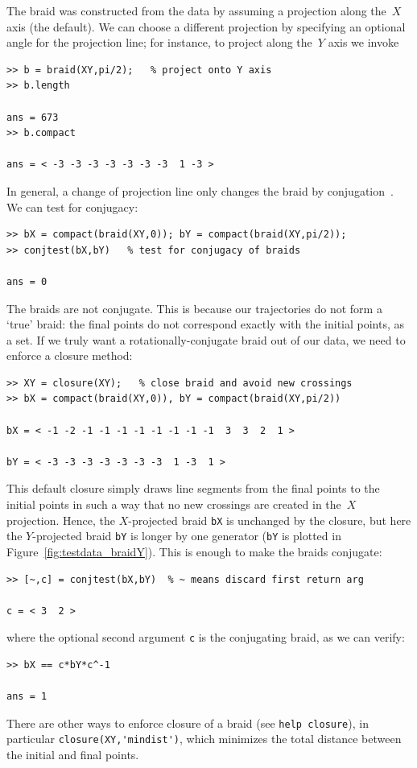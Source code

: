\documentclass[12pt]{article}
\begin{document}
The braid was constructed from the data by assuming a projection along
the~$X$ axis (the default).  We can choose a different projection by
specifying an optional angle for the projection line; for instance, to
project along the~$Y$ axis we invoke
\begin{lstlisting}[frame=single,framerule=0pt]
>> b = braid(XY,pi/2);   % project onto Y axis
>> b.length

ans = 673
>> b.compact

ans = < -3 -3 -3 -3 -3 -3 -3  1 -3 >
\end{lstlisting}
In general, a change of projection line only changes the braid by
conjugation~\citep{Boyland1994,Thiffeault2010}.  We can test for
conjugacy:
\begin{lstlisting}[frame=single,framerule=0pt]
>> bX = compact(braid(XY,0)); bY = compact(braid(XY,pi/2));
>> conjtest(bX,bY)   % test for conjugacy of braids

ans = 0
\end{lstlisting}
The braids are not conjugate.  This is because our trajectories do not
form a `true' braid: the final points do not correspond exactly with
the initial points, as a set.  If we truly want a
rotationally-conjugate braid out of our data, we need to enforce a
closure method:
\begin{lstlisting}[frame=single,framerule=0pt]
>> XY = closure(XY);   % close braid and avoid new crossings
>> bX = compact(braid(XY,0)), bY = compact(braid(XY,pi/2))

bX = < -1 -2 -1 -1 -1 -1 -1 -1 -1 -1  3  3  2  1 >

bY = < -3 -3 -3 -3 -3 -3 -3  1 -3  1 >
\end{lstlisting}
This default closure simply draws line segments from the final points
to the initial points in such a way that no new crossings are created
in the~$X$ projection.  Hence, the $X$-projected braid \lstinline{bX}
is unchanged by the closure, but here the $Y$-projected braid
\lstinline{bY} is longer by one generator (\lstinline{bY} is plotted
in Figure~\ref{fig:testdata_braidY}).  This is enough to make the
braids conjugate:
\begin{lstlisting}[frame=single,framerule=0pt]
>> [~,c] = conjtest(bX,bY)  % ~ means discard first return arg

c = < 3  2 >
\end{lstlisting}
where the optional second argument \lstinline{c} is the conjugating
braid, as we can verify:
\begin{lstlisting}[frame=single,framerule=0pt]
>> bX == c*bY*c^-1

ans = 1
\end{lstlisting}
There are other ways to enforce closure of a braid (see
\lstinline{help closure}), in particular
\lstinline{closure(XY,'mindist')}, which minimizes the total distance
between the initial and final points.
\end{document}
